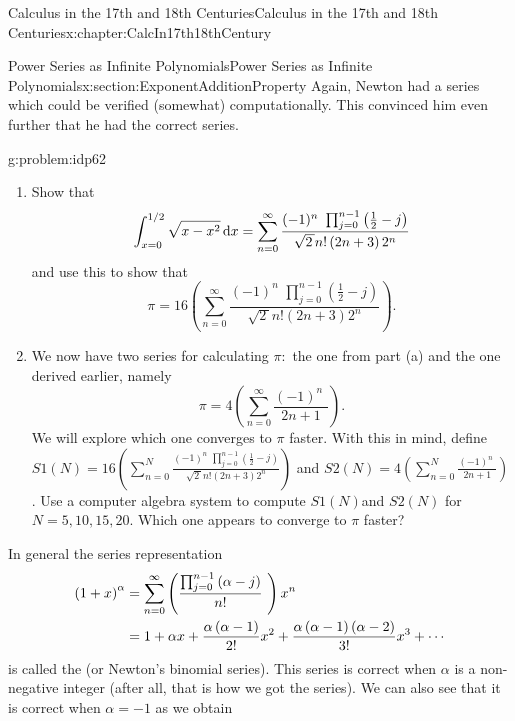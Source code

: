 \begin{chapterptx}{Calculus in the 17th and 18th Centuries}{}{Calculus in the 17th and 18th Centuries}{}{}{x:chapter:CalcIn17th18thCentury}
\begin{sectionptx}{Power Series as Infinite Polynomials}{}{Power Series as Infinite Polynomials}{}{}{x:section:ExponentAdditionProperty}
		Again, Newton had a series which could be verified (somewhat) computationally. This convinced him even further that he had the correct series.%
		\begin{problem}{}{g:problem:idp62}%
			\begin{enumerate}[label=(\alph*)]
				\item{}Show that%
				\begin{equation*}
					\int_{x=0}^{1/2}\sqrt{x-x^2}\,{\rm d} x=\sum_{n=0}^\infty\frac{(-1)^n\,\,\prod_{j=0}^{n-1}\left(\frac{1}{2}-j\right)}{\sqrt{2\,}n!\left(2n+3\right)2^n}
				\end{equation*}
				and use this to show that%
				\begin{equation*}
					\pi=16\left(\sum_{n=0}^\infty\frac{(-1)^n\,\,\prod_{j=0}^{n-1}\left(\frac{1}{2}-j\right)}{\sqrt{2\,}n!\left(2n+3\right)2^n}\right)\text{.}
				\end{equation*}
				\item{}We now have two series for calculating \(\pi:\)  the one from part (a) and the one derived earlier, namely%
				\begin{equation*}
					\pi=4\left(\sum_{n=0}^\infty\frac{(-1)^n\,\,}{2n+1}\right)\text{.}
				\end{equation*}
				We will explore which one converges to \(\pi\) faster. With this in mind, define \(S1(N)=16\left(\sum_{n=0}^N\frac{(-1)^n\,\,\prod_{j=0}^{n-1}\left( \frac{1}{2}-j\right)}{\sqrt{2\,}n!\left(2n+3\right)2^n}\right)\) and \(S2(N)=4\left(\sum_{n=0}^N\frac{(-1)^n\,\,}{2n+1}\right)\). Use a computer algebra system to compute \(S1(N)\)and \(S2(N)\) for \(N=5,10,15,20\). Which one appears to converge to \(\pi\) faster?%
			\end{enumerate}
		\end{problem}
		In general the series representation%
		\begin{align*}
			\left(1+x\right)^\alpha &  =\sum_{n=0}^\infty\left(\frac{\prod_{j=0}^{n-1}\left(\alpha-j\right)}{n!}\text{ } \right)x^n\\
			& =1+\alpha x+\frac{\alpha\left(\alpha-1\right)}{2!}x^2+\frac{\alpha\left(\alpha-1\right)\left(\alpha-2\right)}{3!}x^3+\cdots
		\end{align*}
		is called the  (or Newton's binomial series). This series is correct when \(\alpha\) is a non-negative integer (after all, that is how we got the series). We can also see that it is correct when \(\alpha=-1\) as we obtain%
		\begin{align*}

\end{align*}
\end{sectionptx}
\end{chapterptx}
